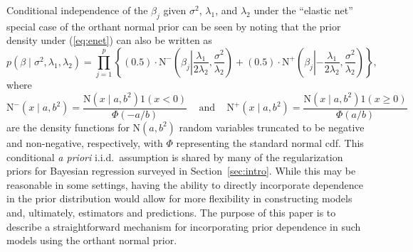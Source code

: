 \documentclass[12pt]{article}
\begin{document}
Conditional independence of the $\beta_j$ given $\sigma^2$, $\lambda_1$, and $\lambda_2$ under 
the ``elastic net'' special case 
of the orthant normal prior can be seen by noting that the prior density under (\ref{eq:enet}) can also 
be written as
\[
	p(\beta \mid \sigma^2, \lambda_1, \lambda_2) = \prod_{j=1}^p
		\left\{ (0.5)\cdot \mbox{N}^{-}\left( \beta_j \left| \frac{\lambda_1}{2\lambda_2},
		\frac{\sigma^2}{\lambda_2}\right)\right.
		+
		(0.5)\cdot \mbox{N}^{+}\left( \beta_j \left| -\frac{\lambda_1}{2\lambda_2},
		\frac{\sigma^2}{\lambda_2}\right)\right.
		\right\},
\]
where
\[
	\mbox{N}^-(x \mid a, b^2) = \frac{\mbox{N}(x \mid a, b^2)1(x < 0)}
		{\Phi(-a/b)}
		\;\;\;\mbox{ and }\;\;\;
	\mbox{N}^+(x \mid a, b^2) = \frac{\mbox{N}(x \mid a, b^2)1(x \geq 0)}
		{\Phi(a/b)}
\]
are the density functions for $\mbox{N}(a,b^2)$ random variables truncated to be negative and
non-negative, respectively, with $\Phi$ representing the standard normal cdf.
This conditional \emph{a priori} i.i.d.~assumption is shared by many of the 
regularization priors for Bayesian regression surveyed in Section~\ref{sec:intro}.
While this may be reasonable in some settings, having the ability to directly incorporate 
dependence in the prior distribution would allow for more flexibility in constructing
models and, ultimately, estimators and predictions.  The purpose of this paper is to describe a 
straightforward mechanism for incorporating prior dependence in such models using the orthant 
normal prior.
\end{document}
